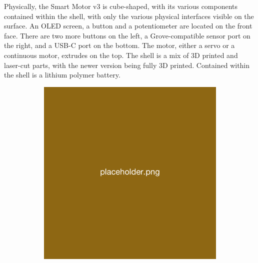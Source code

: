 Physically, the Smart Motor v3 is cube-shaped, with its various components contained within the shell, with only the various physical interfaces visible on the surface. 
An OLED screen, a button and a potentiometer are located on the front face. There are two more buttons on the left, a Grove-compatible sensor port on the right, and a USB-C port on the bottom. The motor, either a servo or a continuous motor, extrudes on the top. The shell is a mix of 3D printed and laser-cut parts, with the newer version being fully 3D printed. Contained within the shell is a lithium polymer battery.

\begin{figure}[H]
    \centering
    \begin{subfigure}[b]{0.25\textwidth}
        \includegraphics[width=\linewidth]{overleaf/images/placeholder.png}
    \end{subfigure}
    \begin{subfigure}[b]{0.25\textwidth}

\end{subfigure}
\end{figure}
